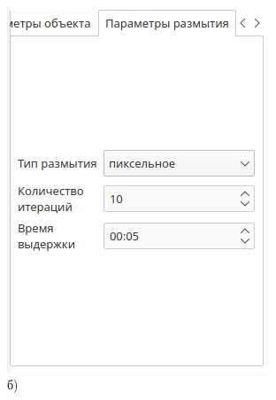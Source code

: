 \begin{figure}[h]
\begin{minipage}[h]{0.32\linewidth}
{            \includegraphics[width=\linewidth]{img/gui/tab2.png} \\ б)
            }
    \end{minipage}
    \hfill
    \begin{minipage}[h]{0.32\linewidth}
        \center{
}
\end{minipage}
\end{figure}
